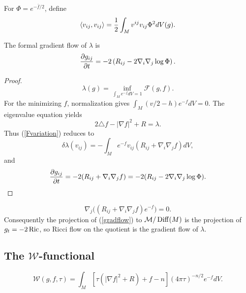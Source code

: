 For $\Phi=e^{-\bar f/2}$, define
\begin{equation}\label{riemmetric}
\langle v_{ij},v_{ij}\rangle={1\over2}\int_Mv^{ij}v_{ij}\Phi^2dV(g).
\end{equation}
\begin{lemma}
  \label{lem:kl-ricci-flow-as-gradient-flow-gradient-flow-formula-lambda-invariant}
The formal gradient flow of $\lambda$ is
\begin{equation}
{\partial g_{ij}\over\partial t}=-2\left(R_{ij}-2\nabla_i\nabla_j\log\Phi\right).
\end{equation}
\end{lemma}
\begin{proof}
\sketch
\begin{equation}\label{eqnlambdadef}
\lambda(g)=\inf_{\int_Me^{-f}dV=1}{\mathcal F}(g,f).
\end{equation}
For the minimizing $f$, normalization gives
$\int_M(v/2-h)e^{-f}dV=0$. The eigenvalue equation yields
\begin{equation}\label{feqn}2\triangle f-|\nabla f|^2+R=\lambda.
\end{equation}
Thus (\ref{Fvariation}) reduces to
\begin{equation}\label{lambdavar}
\delta\lambda(v_{ij})=-\int_Me^{-f}v_{ij}(R_{ij}+\nabla_i\nabla_jf)dV,
\end{equation}
and
\begin{equation}\label{gradflow}
{\partial g_{ij}\over\partial t}=-2(R_{ij}+\nabla_i\nabla_jf)
=-2(R_{ij}-2\nabla_i\nabla_j\log\Phi).
\end{equation}
\end{proof}
\begin{equation}
\nabla_j\big((R_{ij}+\nabla_i\nabla_jf)e^{-f}\big)=0.
\end{equation}
Consequently the projection of (\ref{gradflow}) to ${\mathcal M}/\operatorname{Diff}(M)$ is
the projection of $g_t=-2\operatorname{Ric}$, so Ricci flow on the quotient is the gradient
flow of $\lambda$.

\subsection{The ${\mathcal W}$-functional}
\label{Basic Example for Section 3.1}

\begin{definition}
  \label{def:kl-w-entropy-w-entropy-definition}
\begin{equation}
{\mathcal W}(g,f,\tau)=\int_M\left[\tau(|\nabla f|^2+R)+f-n\right](4\pi\tau)^{-n/2}e^{-f}dV.
\end{equation}
\end{definition}

